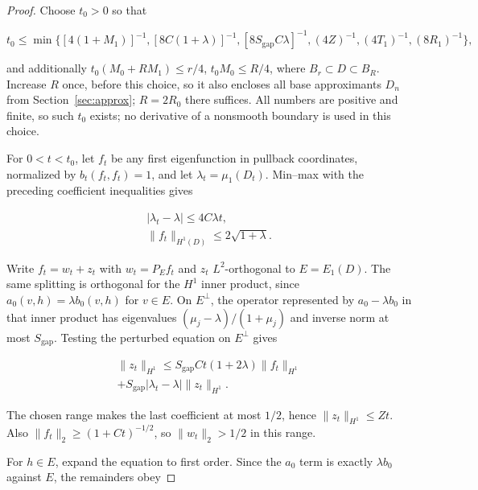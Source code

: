 \documentclass[11pt]{article}
\theoremstyle{definition}
\theoremstyle{remark}
\numberwithin{equation}{section}
\begin{document}
\begin{proof}
Choose $t_0>0$ so that

\begin{equation}\label{eq:src-11-13}
t_0\le\min\{[4(1+M_1)]^{-1},[8C(1+\lambda)]^{-1},[8S_{\mathrm{gap}}C\lambda]^{-1},(4Z)^{-1},(4T_1)^{-1},(8R_1)^{-1}\},
\end{equation}

and additionally $t_0(M_0+RM_1)\le r/4$, $t_0M_0\le R/4$, where $B_r\subset D\subset B_R$. Increase $R$ once, before this choice, so it also encloses all base approximants $D_n$ from Section~\ref{sec:approx}; $R=2R_0$ there suffices. All numbers are positive and finite, so such $t_0$ exists; no derivative of a nonsmooth boundary is used in this choice.

For $0<t<t_0$, let $f_t$ be any first eigenfunction in pullback coordinates, normalized by $b_t(f_t,f_t)=1$, and let $\lambda_t=\mu_1(D_t)$. Min--max with the preceding coefficient inequalities gives

\begin{equation}\label{eq:src-11-14}
\begin{gathered}
|\lambda_t-\lambda|\le4C\lambda t,\qquad \\
\|f_t\|_{H^1(D)}\le2\sqrt{1+\lambda}.
\end{gathered}
\end{equation}

Write $f_t=w_t+z_t$ with $w_t=P_Ef_t$ and $z_t$ $L^2$-orthogonal to $E=E_1(D)$. The same splitting is orthogonal for the $H^1$ inner product, since $a_0(v,h)=\lambda b_0(v,h)$ for $v\in E$. On $E^\perp$, the operator represented by $a_0-\lambda b_0$ in that inner product has eigenvalues $(\mu_j-\lambda)/(1+\mu_j)$ and inverse norm at most $S_{\mathrm{gap}}$. Testing the perturbed equation on $E^\perp$ gives

\begin{equation}\label{eq:src-11-15}
\begin{gathered}
\|z_t\|_{H^1}\le S_{\mathrm{gap}}Ct(1+2\lambda)\|f_t\|_{H^1} \\
+S_{\mathrm{gap}}|\lambda_t-\lambda|\|z_t\|_{H^1}.
\end{gathered}
\end{equation}

The chosen range makes the last coefficient at most $1/2$, hence $\|z_t\|_{H^1}\le Zt$. Also $\|f_t\|_2\ge(1+Ct)^{-1/2}$, so $\|w_t\|_2>1/2$ in this range.

For $h\in E$, expand the equation to first order. Since the $a_0$ term is exactly $\lambda b_0$ against $E$, the remainders obey


\end{proof}
\end{document}
